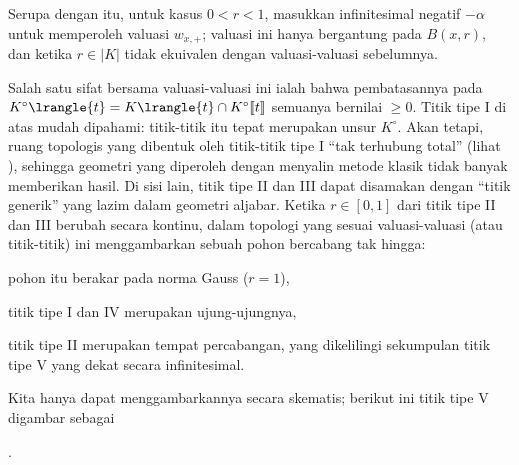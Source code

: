 \begin{enumerate}[I.]
		Serupa dengan itu, untuk kasus $0 < r < 1$, masukkan infinitesimal negatif $-\alpha$ untuk memperoleh valuasi $w_{x,+}$; valuasi ini hanya bergantung pada $B(x,r)$, dan ketika $r \in |K|$ tidak ekuivalen dengan valuasi-valuasi sebelumnya.
\end{enumerate}

Salah satu sifat bersama valuasi-valuasi ini ialah bahwa pembatasannya pada $K^\circ\lrangle{t} = K\lrangle{t} \cap K^\circ\llbracket t\rrbracket$ semuanya bernilai $\geq 0$. Titik tipe I di atas mudah dipahami: titik-titik itu tepat merupakan unsur $K^\circ$. Akan tetapi, ruang topologis yang dibentuk oleh titik-titik tipe I ``tak terhubung total'' (lihat \cite[Definisi 1.7.3]{FL14}), sehingga geometri yang diperoleh dengan menyalin metode klasik tidak banyak memberikan hasil. Di sisi lain, titik tipe II dan III dapat disamakan dengan ``titik generik'' yang lazim dalam geometri aljabar. Ketika $r \in [0,1]$ dari titik tipe II dan III berubah secara kontinu, dalam topologi yang sesuai valuasi-valuasi (atau titik-titik) ini menggambarkan sebuah pohon bercabang tak hingga:
\begin{compactitem}
	\item pohon itu berakar pada norma Gauss ($r=1$),
	\item titik tipe I dan IV merupakan ujung-ujungnya,
	\item titik tipe II merupakan tempat percabangan, yang dikelilingi sekumpulan titik tipe V yang dekat secara infinitesimal.
\end{compactitem}
Kita hanya dapat menggambarkannya secara skematis; berikut ini titik tipe V digambar sebagai .
\begin{center}\end{center}

